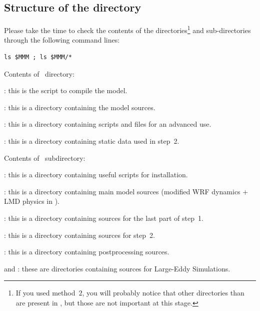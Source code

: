 \sk
\subsection{Structure of the  directory}

\sk
Please take the time to check the contents of the  directories\footnote{If you used method~$2$, you will probably notice that other directories than~ are present in , but those are not important at this stage.} and sub-directories through the following command lines:
\begin{verbatim}
ls $MMM ; ls $MMM/*
\end{verbatim}

\sk
Contents of~ directory:
\begin{citemize}
\item {}: this is the  script to compile the model.
\item {}: this is a directory containing the model sources.
\item {}: this is a directory containing scripts and files for an advanced use.
\item {}: this is a directory containing static data used in step~2.
\end{citemize}

\sk
Contents of~ subdirectory:
\begin{citemize}
\item {}: this is a directory containing useful  scripts for installation.
\item {}: this is a directory containing main model sources (modified WRF dynamics + LMD physics in ).
\item {}: this is a directory containing sources for the last part of step~1.
\item {}: this is a directory containing sources for step~2.
\item {}: this is a directory containing postprocessing sources.
\item {} and : these are directories containing sources for Large-Eddy Simulations.
\end{citemize}

